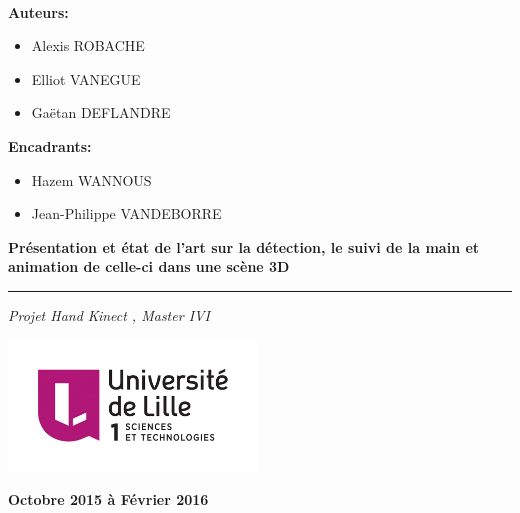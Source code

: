 \documentclass{pjsivi}
\begin{document}

\ 
\vspace{1cm}

\begin{multicols}{2}  

    \textbf{\large Auteurs:}
    \begin{itemize}
      \item Alexis ROBACHE
      \item Elliot VANEGUE
      \item Gaëtan DEFLANDRE
    \end{itemize}
    
    \textbf{\large Encadrants:}\\
    \begin{itemize}
      \item Hazem WANNOUS
      \item Jean-Philippe VANDEBORRE 
    \end{itemize}

\end{multicols}

\vspace{4cm}

 \begin{flushright}
  \begin{spacing}{1.6}
    \textbf{
      {\LARGE Présentation et état de l'art sur la détection, 
      le suivi de la main et animation de celle-ci dans une scène 3D}
    }
  \end{spacing}
  \hrule
  \vspace{0.2cm}
  \textit{
    {\Large\textcolor{mygray}{Projet \og Hand Kinect \fg, Master IVI}}
  }
\end{flushright}

\vspace{4cm}

\begin{center}
  \includegraphics[height=3.5cm]{images/logoLILLE1.jpg}
  \hfill
  \vspace{4cm}


  {\large\textbf{Octobre 2015 à Février 2016}}
\end{center}
\end{document}
